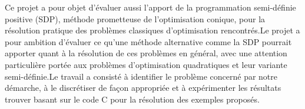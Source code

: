 Ce projet a pour objet d'évaluer aussi l'apport de la programmation semi-définie positive (SDP), méthode prometteuse de l'optimisation conique, pour la résolution pratique des problèmes classiques d'optimisation rencontrés.Le projet a pour ambition d'évaluer ce qu'une méthode alternative comme la SDP pourrait apporter quant à la résolution de ces problèmes en général, avec une attention particulière portée aux problèmes d'optimisation quadratiques et leur variante semi-définie.Le travail a consisté à identifier le problème concerné par notre démarche, \`a le discrétiser de façon appropriée et \`a expérimenter les résultats trouver basant sur le code C pour la résolution des exemples proposés. 


